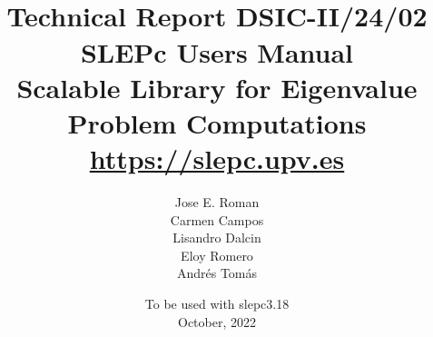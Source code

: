\documentclass[titlepage,10pt,a4paper]{book}
\newcommand{\slepcversion}{3.18}
\newcommand{\slepchome}{https://slepc.upv.es}
\newcommand{\packnoi}[1]{{\sc #1}\xspace}
\newcommand{\slepc}{\texorpdfstring{\packnoi{slep\rm c}}{{SLEPc}}}
\begin{document}
\title{
 	\vspace*{-1cm}
	\\[2cm]
	\normalsize Technical Report DSIC-II/24/02
	\\[2cm]
	\vspace*{6mm}
	{\Large\bf\sffamily
	SLEPc Users Manual\\[2mm]}
	{\large\bf\sffamily
	Scalable Library for Eigenvalue Problem Computations}\\[2mm]
	\vspace*{6mm}
	\vspace*{6mm}
	\url{\slepchome}
	\\[6mm]
}

\author{
  Jose E. Roman\\
  Carmen Campos\\
  Lisandro Dalcin\\
  Eloy Romero\\
  Andr\'es Tom\'as\\[3mm]
}

\date{
	To be used with \slepc \slepcversion\\
	October, 2022
}

\hypersetup{pageanchor=false}
\begin{titlepage}
\maketitle
\end{titlepage}

\setlength{\textheight}{18cm}
\setlength{\oddsidemargin}{0.6cm}
\setlength{\evensidemargin}{0.6cm}
\setlength{\footskip}{2cm}
\setlength{\voffset}{1.3cm}
\end{document}
